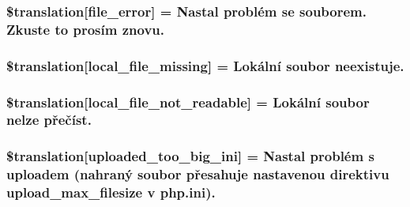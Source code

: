 \subsubsection[{\$translation}]{\setlength{\rightskip}{0pt plus 5cm}\$translation\mbox{[}\textquotesingle{}file\+\_\+error\textquotesingle{}\mbox{]} = \textquotesingle{}Nastal problém se souborem. Zkuste to prosím znovu.\textquotesingle{}}\label{class_8upload_8cs___c_s_8php_ac7498e49b9771b04698029aa61c70821}
\hypertarget{class_8upload_8cs___c_s_8php_a6ec3d3a47ab70d77e7aa593e82ead10e}{}
\subsubsection[{\$translation}]{\setlength{\rightskip}{0pt plus 5cm}\$translation\mbox{[}\textquotesingle{}local\+\_\+file\+\_\+missing\textquotesingle{}\mbox{]} = \textquotesingle{}Lokální soubor neexistuje.\textquotesingle{}}\label{class_8upload_8cs___c_s_8php_a6ec3d3a47ab70d77e7aa593e82ead10e}
\hypertarget{class_8upload_8cs___c_s_8php_a60104befef9b241f3a7a6a755618a4b3}{}
\subsubsection[{\$translation}]{\setlength{\rightskip}{0pt plus 5cm}\$translation\mbox{[}\textquotesingle{}local\+\_\+file\+\_\+not\+\_\+readable\textquotesingle{}\mbox{]} = \textquotesingle{}Lokální soubor nelze přečíst.\textquotesingle{}}\label{class_8upload_8cs___c_s_8php_a60104befef9b241f3a7a6a755618a4b3}
\hypertarget{class_8upload_8cs___c_s_8php_a6a08dcd0d3651fdd098568f6b2f0a42c}{}
\subsubsection[{\$translation}]{\setlength{\rightskip}{0pt plus 5cm}\$translation\mbox{[}\textquotesingle{}uploaded\+\_\+too\+\_\+big\+\_\+ini\textquotesingle{}\mbox{]} = \textquotesingle{}Nastal problém s uploadem (nahraný soubor přesahuje nastavenou direktivu upload\+\_\+max\+\_\+filesize v php.\+ini).\textquotesingle{}}\label{class_8upload_8cs___c_s_8php_a6a08dcd0d3651fdd098568f6b2f0a42c}
\hypertarget{class_8upload_8cs___c_s_8php_a623d5b8b92169f57d7e43458aa911cbb}{}
